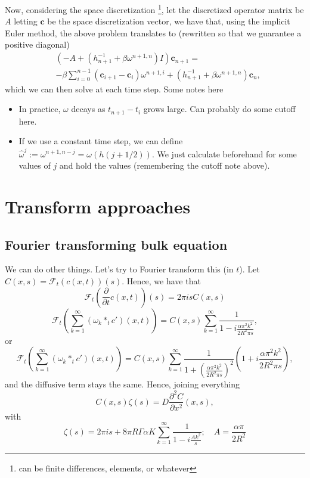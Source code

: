 \documentclass[]{article}
\newcommand{\pderiv}[2]{\frac{\partial #1}{\partial #2}}
\begin{document}
Now, considering the space discretization \footnote{can be finite differences, elements, or whatever}, let the discretized operator matrix be $A$ letting $\mathbf{c}$ be the space discretization vector, we have that, using the implicit Euler method, the above problem translates to (rewritten so that we guarantee a positive diagonal)
\begin{equation}
 \begin{split}
 & \left(-A + (h_{n+1}^{-1} + \beta \omega^{n+1, n}) I \right)\mathbf{c}_{n+1} = \\
 & -\beta \sum_{i=0}^{n-1} (\mathbf{c}_{i+1} - \mathbf{c}_i) \omega^{n+1, i} + \left(h_{n+1}^{-1} + \beta \omega^{n+1, n} \right) \mathbf{c}_{n},
 \end{split}
\end{equation}
which we can then solve at each time step. Some notes here
\begin{itemize}
	\item In practice, $\omega$ decays as $t_{n+1} - t_i$ grows large. Can probably do some cutoff here.
	\item If we use a constant time step, we can define $\hat{\omega}^j := \omega^{n+1, n-j} = \omega(h(j + 1/2))$. We just calculate beforehand for some values of $j$ and hold the values (remembering the cutoff note above).
\end{itemize}


\section{Transform approaches}
\subsection{Fourier transforming bulk equation}
We can do other things. Let's try to Fourier transform this (in $t$). Let $C(x,s) = \mathcal{F}_t(c(x,t))(s)$. Hence, we have that
\begin{equation}
\mathcal{F}_t\left(\pderiv{}{t}c(x,t) \right)(s) = 2 \pi i s C(x,s)
\end{equation}
\begin{equation}
\mathcal{F}_t\left(\sum_{k=1}^\infty (\omega_k *_t c')(x,t)\right) = C(x,s) \sum_{k=1}^\infty \frac{1}{1 - i\frac{\alpha \pi^2 k^2}{2 R^2 \pi s}},
\end{equation}
or
\begin{equation}
\mathcal{F}_t\left(\sum_{k=1}^\infty (\omega_k *_t c')(x,t)\right) = C(x,s) \sum_{k=1}^\infty \frac{1}{1 + \left(\frac{\alpha \pi^2 k^2}{2 R^2 \pi s}\right)^2}\left(1 + i\frac{\alpha \pi^2 k^2}{2 R^2 \pi s}\right),
\end{equation}
and the diffusive term stays the same. Hence, joining everything
\begin{equation}
C(x,s) \zeta(s) = D \frac{\partial^2 C}{\partial x^2}(x,s),
\end{equation}
with
\begin{equation}
\zeta(s) = 2 \pi i s + 8 \pi R \Gamma \alpha K \sum_{k=1}^\infty \frac{1}{1 - i \frac{A k^2}{s}}; \quad A = \frac{\alpha \pi}{2 R^2}
\end{equation}
\end{document}
